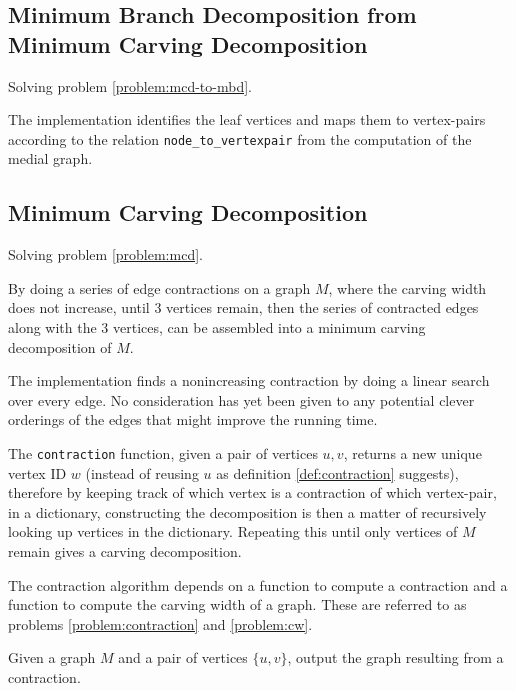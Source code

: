 \documentclass{article}
\begin{document}

	\subsection{Minimum Branch Decomposition from Minimum Carving Decomposition}

		Solving problem \ref{problem:mcd-to-mbd}.

		The implementation identifies the leaf vertices and maps them to vertex-pairs according to the relation \texttt{node_to_vertexpair} from the computation of the medial graph.

			
	\subsection{Minimum Carving Decomposition}

		Solving problem \ref{problem:mcd}.

		By doing a series of edge contractions on a graph $M$, where the carving width does not increase, until 3 vertices remain, then the series of contracted edges along with the 3 vertices, can be assembled into a minimum carving decomposition of $M$.

		The implementation finds a nonincreasing contraction by doing a linear search over every edge. No consideration has yet been given to any potential clever orderings of the edges that might improve the running time.

		The \texttt{contraction} function, given a pair of vertices $u,v$, returns a new unique vertex ID $w$ (instead of reusing $u$ as definition \ref{def:contraction} suggests), therefore by keeping track of which vertex is a contraction of which vertex-pair, in a dictionary, constructing the decomposition is then a matter of recursively looking up vertices in the dictionary. Repeating this until only vertices of $M$ remain gives a carving decomposition.


		The contraction algorithm depends on a function to compute a contraction and a function to compute the carving width of a graph. These are referred to as problems \ref{problem:contraction} and \ref{problem:cw}.

		\begin{problem}\label{problem:contraction}
			Given a graph $M$ and a pair of vertices $\{u, v\}$, output the graph resulting from a contraction.
		\end{problem}
\end{document}
